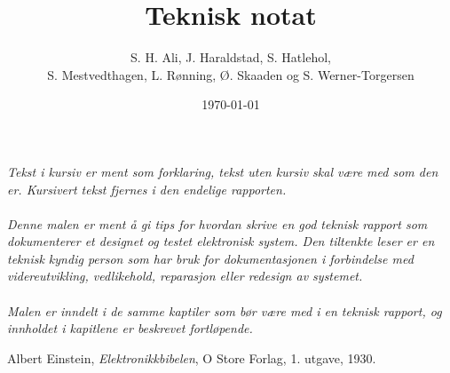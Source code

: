 \documentclass[11pt,norsk]{elsys-teknisk}
\title{Teknisk notat}
\author{S. H. Ali, J. Haraldstad, S. Hatlehol, \\ S. Mestvedthagen, L. Rønning, Ø. Skaaden og S. Werner-Torgersen}
\date{\today}
\begin{document}
\maketitle

\toc


\textit{Tekst i kursiv er ment som forklaring, tekst uten kursiv skal være med som den er. Kursivert tekst fjernes i den endelige rapporten.\\
\\
Denne malen er ment å gi tips for hvordan skrive en god teknisk rapport som dokumenterer et designet og testet elektronisk system. Den tiltenkte leser er en teknisk kyndig person som har bruk for dokumentasjonen i forbindelse med videreutvikling, vedlikehold, reparasjon eller redesign av systemet.\\
\\
Malen er inndelt i de samme kaptiler som bør være med i en teknisk rapport, og innholdet i kapitlene er beskrevet fortløpende.
}

\jolyu

\newpage



\newpage



\newpage



\newpage



\newpage



\newpage




{}
\begin{thebibliography}{99}

  Albert Einstein,
  \emph{Elektronikkbibelen},
  O Store Forlag,
  1. utgave,
  1930.

\end{thebibliography}


\appendix

\end{document}
